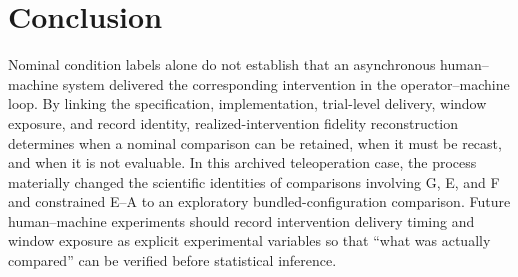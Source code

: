 \documentclass[journal]{IEEEtran}
\begin{document}
\section{Conclusion}

Nominal condition labels alone do not establish that an asynchronous
human--machine system delivered the corresponding intervention in the
operator--machine loop. By linking the specification, implementation,
trial-level delivery, window exposure, and record identity,
realized-intervention fidelity reconstruction determines when a nominal
comparison can be retained, when it must be recast, and when it is not
evaluable. In this archived teleoperation case, the process materially changed
the scientific identities of comparisons involving G, E, and F and constrained
E--A to an exploratory bundled-configuration comparison. Future human--machine
experiments should record intervention delivery timing and window exposure as
explicit experimental variables so that ``what was actually compared'' can be
verified before statistical inference.

\begingroup
\sloppy
\hfuzz=1pt


\endgroup
\end{document}
